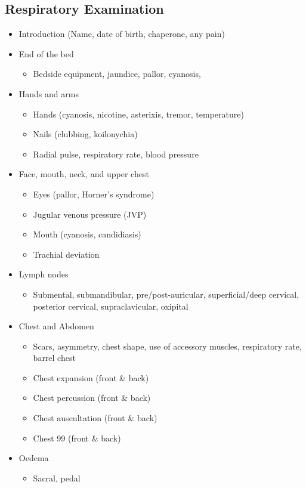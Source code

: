 \clearpage
\subsection{Respiratory Examination}

\begin{itemize}
    \item Introduction (Name, date of birth, chaperone, any pain)
    \item End of the bed
    \begin{itemize}
        \item Bedside equipment, jaundice, pallor, cyanosis, 
    \end{itemize}
    \item Hands and arms
    \begin{itemize}
        \item Hands (cyanosis, nicotine, asterixis, tremor, temperature)
        \item Nails (clubbing, koilonychia)
        \item Radial pulse, respiratory rate, blood pressure
    \end{itemize}
    \item Face, mouth, neck, and upper chest
    \begin{itemize}
        \item Eyes (pallor, Horner’s syndrome)
        \item Jugular venous pressure (JVP)
        \item Mouth (cyanosis, candidiasis)
        \item Trachial deviation
    \end{itemize}    
    \item Lymph nodes
    \begin{itemize}
        \item Submental, submandibular, pre/post-auricular, superficial/deep cervical, posterior cervical, supraclavicular, oxipital
    \end{itemize}
    \item Chest and Abdomen
    \begin{itemize}
        \item Scars, asymmetry, chest shape, use of accessory muscles, respiratory rate, barrel chest
        \item Chest expansion (front \& back)
        \item Chest percussion (front \& back)
        \item Chest auscultation (front \& back)
        \item Chest 99 (front \& back)
    \end{itemize}
    \item Oedema
    \begin{itemize}
        \item Sacral, pedal
    \end{itemize}
\end{itemize}


